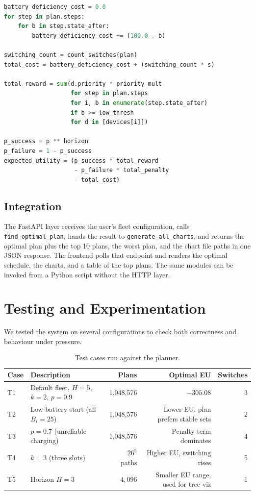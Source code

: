 \documentclass[11pt,a4paper]{article}
\begin{document}
\begin{lstlisting}[language=Python, caption={Plan scoring (excerpt)}]
battery_deficiency_cost = 0.0
for step in plan.steps:
    for b in step.state_after:
        battery_deficiency_cost += (100.0 - b)

switching_count = count_switches(plan)
total_cost = battery_deficiency_cost + (switching_count * s)

total_reward = sum(d.priority * priority_mult
                   for step in plan.steps
                   for i, b in enumerate(step.state_after)
                   if b >= low_thresh
                   for d in [devices[i]])

p_success = p ** horizon
p_failure = 1 - p_success
expected_utility = (p_success * total_reward
                    - p_failure * total_penalty
                    - total_cost)
\end{lstlisting}

\subsection*{Integration}
The FastAPI layer receives the user's fleet configuration, calls
\texttt{find\_optimal\_plan}, hands the result to
\texttt{generate\_all\_charts}, and returns the optimal plan plus the top 10
plans, the worst plan, and the chart file paths in one JSON response. The
frontend polls that endpoint and renders the optimal schedule, the charts, and
a table of the top plans. The same modules can be invoked from a Python script
without the HTTP layer.

\section{Testing and Experimentation}

We tested the system on several configurations to check both correctness and
behaviour under pressure.

\begin{table}[H]
\centering
\small
\begin{tabular}{llrrr}
\toprule
Case & Description & Plans & Optimal EU & Switches \\
\midrule
T1 & Default fleet, $H=5$, $k=2$, $p=0.9$ & 1{,}048{,}576 & $-305.08$ & 3 \\
T2 & Low-battery start (all $B_i = 25$) & 1{,}048{,}576 & Lower EU, plan prefers stable sets & 2 \\
T3 & $p = 0.7$ (unreliable charging) & 1{,}048{,}576 & Penalty term dominates & 4 \\
T4 & $k = 3$ (three slots) & $26^{5}$ paths & Higher EU, switching rises & 5 \\
T5 & Horizon $H = 3$ & $4{,}096$ & Smaller EU range, used for tree viz & 1 \\
\bottomrule
\end{tabular}
\caption{Test cases run against the planner.}
\end{table}
\end{document}
